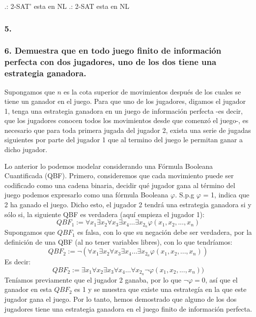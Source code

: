\documentclass[12pt]{article}
\begin{document}
.: 2-SAT’ esta en NL 
.: 2-SAT esta en NL

\subsubsection*{5.}

\subsubsection*{6. Demuestra que en todo juego finito de información perfecta con dos jugadores, uno de
los dos tiene una estrategia ganadora.}

Supongamos que $n$ es la cota superior de movimientos después de los cuales se tiene un ganador en el juego. Para que uno de los jugadores, digamos el jugador 1,
tenga una estrategia ganadora en un juego de información perfecta -es decir, que los jugadores conocen todos los movimientos desde que comenzó el juego-, es necesario que para toda primera jugada del jugador 2, exista una serie de jugadas siguientes por parte del jugador 1 que al termino del juego le permitan ganar a dicho jugador.

Lo anterior lo podemos modelar considerando una Fórmula Booleana Cuantificada (QBF). Primero, consideremos que cada movimiento puede ser codificado como una cadena binaria, decidir qué jugador gana al término del juego podemos expresarlo como una fórmula Booleana $\varphi$. S.p.g $\varphi$ = 1, indica que 2 ha ganado el juego. Dicho esto, el jugador 2 tendrá una estrategia ganadora si y sólo si, la siguiente QBF es verdadera (aquí empieza el jugador 1):
\begin{equation}
  QBF_1 := \forall{x_1}\exists{x_2}\forall{x_3}\exists{x_4}\dots\exists{x_{2_n}} \varphi(x_1,x_2,...,x_n) 
\end{equation}
Supongamos que $QBF_1$ es falsa, con lo que su negación debe ser verdadera, por la definición de una QBF (al no tener variables libres),
con lo que tendríamos:
\begin{equation}
  QBF_2 := \neg(\forall{x_1}\exists{x_2}\forall{x_3}\exists{x_4}\dots\exists{x_{2_n}} \varphi(x_1,x_2,...,x_n))
\end{equation}
Es decir:
\begin{equation}
  QBF_2 := \exists{x_1}\forall{x_2}\exists{x_3}\forall{x_4}\dots\forall{x_{2_n}} \neg\varphi(x_1,x_2,...,x_n))
\end{equation}
Teníamos previamente que el jugador 2 ganaba, por lo que $\neg\varphi = 0$, así que el ganador en esta $QBF_2$ es 1 y se muestra que existe una
estrategía en la que este jugador gana el juego.
Por lo tanto, hemos demostrado que alguno de los dos jugadores tiene una estrategia ganadora en el juego finito de información perfecta.
\end{document}
